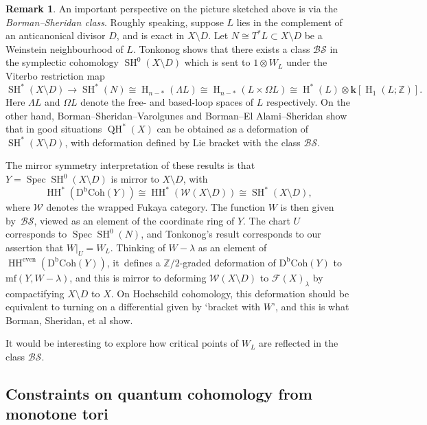 \documentclass[JEP,XML,SOM,Unicode,NoEqCountersInSection,NoFloatCountersInSection,published]{cedram}
\theoremstyle{definition}
\newtheorem{remark}[theorem]{Remark}
\newcommand{\ZZ}{\mathbb{Z}}
\newcommand{\Fuk}{\mathcal{F}}
\newcommand{\kk}{{\boldsymbol{k}}}
\newcommand{\mf}{\mathrm{mf}}
\newcommand{\rH}{\operatorname{H}}
\newcommand{\HH}{\operatorname{HH}}
\newcommand{\Spec}{\operatorname{Spec}}
\newcommand{\QH}{\operatorname{QH}}
\newcommand{\SH}{\operatorname{SH}}
\begin{document}
\begin{remark}
An important perspective on the picture sketched above is via the \emph{Borman--Sheridan class}. Roughly speaking, suppose $L$ lies in the complement of an anticanonical divisor $D$, and is exact in $X \setminus D$. Let $N \cong T^*L \subset X \setminus D$ be a Weinstein neighbourhood of $L$. Tonkonog \cite{TonkonogSHtoLEG} shows that there exists a class $\mathcal{BS}$ in the symplectic cohomology $\SH^0(X \setminus D)$ which is sent to $1 \otimes W_L$ under the Viterbo restriction map
\[
\SH^*(X \setminus D) \to \SH^*(N) \cong \rH_{n-*}(\Lambda L) \cong \rH_{n-*}(L \times \Omega L) \cong \rH^*(L) \otimes \kk[\rH_1(L; \ZZ)].
\]
Here $\Lambda L$ and $\Omega L$ denote the free- and based-loop spaces of $L$ respectively. On the other hand, Borman--Sheridan--Varolgunes \cite{BormanSheridanVarolgunes} and Borman--El Alami--Sheridan \cite{BormanElAlamiSheridanMaurerCartan} show that in good situations $\QH^*(X)$ can be obtained as a deformation of $\SH^*(X \setminus D)$, with deformation defined by Lie bracket with the class $\mathcal{BS}$.

The mirror symmetry interpretation of these results is that $Y = \Spec \SH^0(X \setminus D)$ is mirror to $X \setminus D$, with
\[
\HH^*(\operatorname{D^bCoh}(Y)) \cong \HH^*(\mathcal{W}(X \setminus D)) \cong \SH^*(X \setminus D),
\]
where $\mathcal{W}$ denotes the wrapped Fukaya category. The function $W$ is then given by~$\mathcal{BS}$, viewed as an element of the coordinate ring of $Y$. The chart $U$ corresponds to $\Spec \SH^0(N)$, and Tonkonog's result corresponds to our assertion that $W|_U = W_L$. Thinking of $W-\lambda$ as an element of $\HH^{\mathrm{even}}(\operatorname{D^bCoh}(Y))$, it~defines a $\ZZ/2$-graded deformation of $\operatorname{D^bCoh}(Y)$ to $\mf(Y, W-\lambda)$, and this is mirror to deforming $\mathcal{W}(X \setminus D)$ to $\Fuk(X)_\lambda$ by compactifying $X \setminus D$ to $X$. On Hochschild cohomology, this deformation should be equivalent to turning on a differential given by `bracket with $W$', and this is what Borman, Sheridan, et al show.

It would be interesting to explore how critical points of $W_L$ are reflected in the class $\mathcal{BS}$.
\end{remark}

\subsection{Constraints on quantum cohomology from monotone tori}
\end{document}
